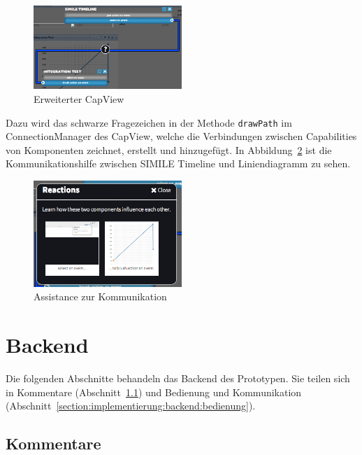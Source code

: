 \documentclass[
	headsepline,
	footsepline,
	fontsize=12pt,
	bibliography=totoc
]{scrbook}
\begin{document}
\begin{figure}[htbp]
   \centering
   \includegraphics[width=0.5\textwidth]{images/implementierung-ui-capview.png}
   \caption{Erweiterter CapView}
   \label{figure:ui-capview}
\end{figure}

Dazu wird das schwarze Fragezeichen in der Methode \texttt{drawPath} im ConnectionManager des CapView, welche die Verbindungen zwischen Capabilities von Komponenten zeichnet, erstellt und hinzugefügt. In Abbildung~\ref{figure:ui-communication} ist die Kommunikationshilfe zwischen SIMILE Timeline und Liniendiagramm zu sehen.

\begin{figure}[htbp]
   \centering
   \includegraphics[width=0.5\textwidth]{images/implementierung-ui-communication.png}
   \caption{Assistance zur Kommunikation}
   \label{figure:ui-communication}
\end{figure}

\section{Backend}
\label{section:implementierung:backend}

Die folgenden Abschnitte behandeln das Backend des Prototypen. Sie teilen sich in Kommentare (Abschnitt~\ref{section:implementierung:backend:kommentare}) und Bedienung und Kommunikation (Abschnitt~\ref{section:implementierung:backend:bedienung}).

\subsection{Kommentare}
\label{section:implementierung:backend:kommentare}
\end{document}
